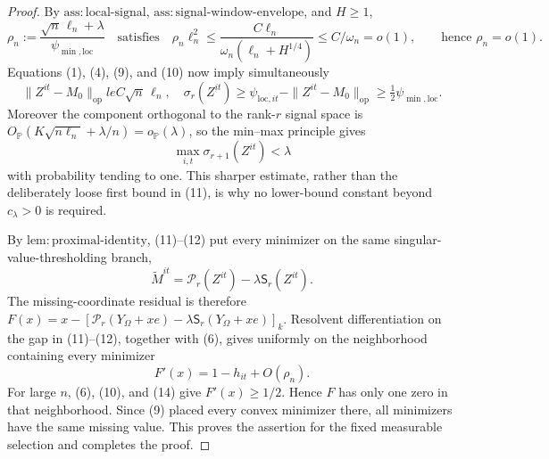 \documentclass{article}
\begin{document}
\begin{proof}
By \(\mathrm{ass:local\mbox{-}signal}\), \(\mathrm{ass:signal\mbox{-}window\mbox{-}envelope}\), and \(H\ge1\),
\[
 \rho_n:=\frac{\sqrt n\,\ell_n+\lambda}{\psi_{\min,\mathrm{loc}}}
 \quad\text{satisfies}\quad
 \rho_n\ell_n^2
 \le \frac{C\ell_n}{\omega_n(\ell_n+H^{1/4})}
 \le C/\omega_n=o(1),
 \qquad\text{hence }\rho_n=o(1).
\tag{10}
\]
Equations (1), (4), (9), and (10) now imply simultaneously
\[
 \|Z^{it}-M_0\|_{\mathrm{op}}le C\sqrt n\,\ell_n,
 \quad \sigma_r(Z^{it})\ge\psi_{\mathrm{loc},it}-\|Z^{it}-M_0\|_{\mathrm{op}}
 \ge\tfrac12\psi_{\min,\mathrm{loc}}.
\tag{11}
\]
Moreover the component orthogonal to the rank-\(r\) signal space is \(O_{\mathbb P}(K\sqrt{n\ell_n}+\lambda/n)=o_{\mathbb P}(\lambda)\), so the min--max principle gives
\[
 \max_{i,t}\sigma_{r+1}(Z^{it})<\lambda
\tag{12}
\]
with probability tending to one. This sharper estimate, rather than the deliberately loose first bound in (11), is why no lower-bound constant beyond \(c_\lambda>0\) is required.

By \(\mathrm{lem:proximal\mbox{-}identity}\), (11)--(12) put every minimizer on the same singular-value-thresholding branch,
\[
 \widetilde M^{it}=\mathcal P_r(Z^{it})-\lambda\mathsf S_r(Z^{it}).
\tag{13}
\]
The missing-coordinate residual is therefore
\(F(x)=x-[\mathcal P_r(Y_\Omega+xe)-\lambda\mathsf S_r(Y_\Omega+xe)]_k\). Resolvent differentiation on the gap in (11)--(12), together with (6), gives uniformly on the neighborhood containing every minimizer
\[
 F'(x)=1-h_{it}+O(\rho_n).
\tag{14}
\]
For large \(n\), (6), (10), and (14) give \(F'(x)\ge1/2\). Hence \(F\) has only one zero in that neighborhood. Since (9) placed every convex minimizer there, all minimizers have the same missing value. This proves the assertion for the fixed measurable selection and completes the proof.
\end{proof}
\end{document}
